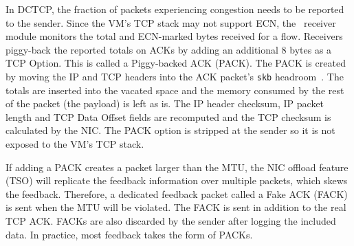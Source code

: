 In DCTCP, the fraction of packets experiencing congestion needs to be reported to the sender. 
Since the VM's TCP stack may not support ECN, the~\acdc{} receiver module monitors
the total and ECN-marked bytes received for a flow. Receivers piggy-back the
reported totals on ACKs by adding an additional 8 bytes as a TCP Option. This is called 
a Piggy-backed ACK (PACK). The PACK is created by moving the IP and TCP headers into
the ACK packet's {\tt skb} headroom~\cite{kernel-skb}. The totals are inserted into the vacated space and the memory
consumed by the rest of the packet (\ie{}the payload) is left as is. The IP header checksum, IP packet length and TCP Data Offset fields are recomputed and the 
TCP checksum is calculated by the NIC. The PACK option is stripped at the
sender so it is not exposed to the VM's TCP stack. 

If adding a PACK creates a packet larger than the MTU, the NIC offload feature (\ie{}TSO)
will replicate the feedback information over multiple packets, which skews the feedback.
Therefore, a dedicated feedback packet called a Fake ACK (FACK) is sent when the MTU
will be violated. The FACK is sent in addition to the real TCP ACK.
FACKs are also discarded by the sender after logging the included
data. In practice, most feedback takes the form of PACKs.

%
%

